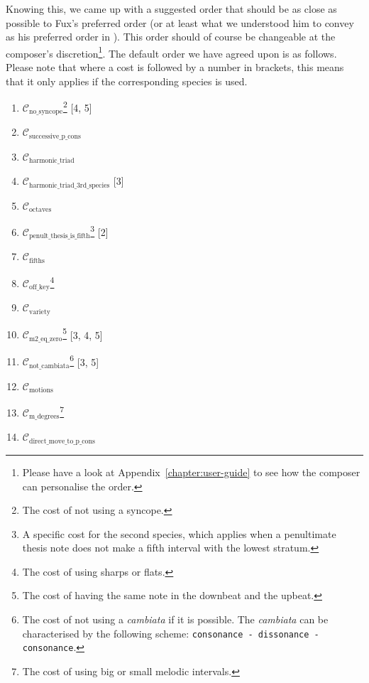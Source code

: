 Knowing this, we came up with a suggested order that should be as close as possible to Fux's preferred order (or at least what we understood him to convey as his preferred order in \gap). This order should of course be changeable at the composer's discretion\footnote{Please have a look at Appendix~\ref{chapter:user-guide} to see how the composer can personalise the order.}. The default order we have agreed upon is as follows. Please note that where a cost is followed by a number in brackets, this means that it only applies if the corresponding species is used.
\begin{multicols}{2}
    \begin{enumerate}\label{fig:default-order-lexico}
        \item $\mathcal{C}_\text{no\_syncope}$\footnote{The cost of not using a syncope.} [4, 5] 
        \item $\mathcal{C}_\text{successive\_p\_cons}$
        \item $\mathcal{C}_\text{harmonic\_triad}$
        \item $\mathcal{C}_\text{harmonic\_triad\_3rd\_species}$ [3]
        \item $\mathcal{C}_\text{octaves}$
        \item $\mathcal{C}_\text{penult\_thesis\_is\_fifth}$\footnote{A specific cost for the second species, which applies when a penultimate thesis note does not make a fifth interval with the lowest stratum.} [2]
        \item $\mathcal{C}_\text{fifths}$
        \item $\mathcal{C}_\text{off\_key}$\footnote{The cost of using sharps or flats.}
        \item $\mathcal{C}_\text{variety}$
        \item $\mathcal{C}_\text{m2\_eq\_zero}$\footnote{The cost of having the same note in the downbeat and the upbeat.} [3, 4, 5]
        \item $\mathcal{C}_\text{not\_cambiata}$\footnote{The cost of not using a \textit{cambiata} if it is possible. The \textit{cambiata} can be characterised by the following scheme: \texttt{consonance - dissonance - consonance}.} [3, 5]
        \item $\mathcal{C}_\text{motions}$
        \item $\mathcal{C}_\text{m\_degrees}$\footnote{The cost of using big or small melodic intervals.}        
        \item $\mathcal{C}_\text{direct\_move\_to\_p\_cons}$
    \end{enumerate}
\end{multicols}

